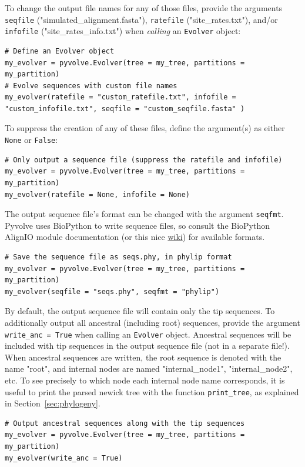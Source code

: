 \documentclass{article}
\newcommand{\code}[1]{\texttt{\small{#1}}}
\begin{document}
To change the output file names for any of those files, provide the arguments \code{seqfile} ("simulated\_alignment.fasta"), \code{ratefile} ("site\_rates.txt"), and/or \code{infofile} ("site\_rates\_info.txt") when \emph{calling} an \code{Evolver} object:
\begin{lstlisting}
# Define an Evolver object
my_evolver = pyvolve.Evolver(tree = my_tree, partitions = my_partition)
# Evolve sequences with custom file names
my_evolver(ratefile = "custom_ratefile.txt", infofile = "custom_infofile.txt", seqfile = "custom_seqfile.fasta" )
\end{lstlisting}

To suppress the creation of any of these files, define the argument(s) as either \code{None} or \code{False}:
\begin{lstlisting}
# Only output a sequence file (suppress the ratefile and infofile)
my_evolver = pyvolve.Evolver(tree = my_tree, partitions = my_partition)
my_evolver(ratefile = None, infofile = None)
\end{lstlisting}

The output sequence file's format can be changed with the argument \code{seqfmt}. Pyvolve uses BioPython to write sequence files, so consult the BioPython AlignIO module documentation (or this nice \href{http://biopython.org/wiki/AlignIO}{wiki}) for available formats.
\begin{lstlisting}
# Save the sequence file as seqs.phy, in phylip format 
my_evolver = pyvolve.Evolver(tree = my_tree, partitions = my_partition)
my_evolver(seqfile = "seqs.phy", seqfmt = "phylip")
\end{lstlisting}

By default, the output sequence file will contain only the tip sequences. To additionally output all ancestral (including root) sequences, provide the argument \code{write\_anc = True} when calling an \code{Evolver} object. Ancestral sequences will be included with tip sequences in the output sequence file (not in a separate file!). When ancestral sequences are written, the root sequence is denoted with the name "root", and internal nodes are named "internal\_node1", "internal\_node2", etc. To see precisely to which node each internal node name corresponds, it is useful to print the parsed newick tree with the function \code{print\_tree}, as explained in Section~\ref{sec:phylogeny}.
\begin{lstlisting}
# Output ancestral sequences along with the tip sequences
my_evolver = pyvolve.Evolver(tree = my_tree, partitions = my_partition)
my_evolver(write_anc = True)
\end{lstlisting}
\end{document}
